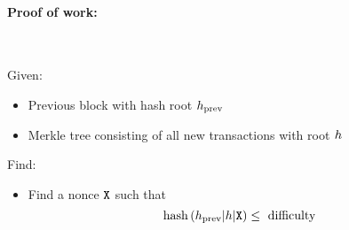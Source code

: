 \paragraph{Proof of work:\newline}
\begin{minipage}{0.75\linewidth}
    \def\svgwidth{\columnwidth}
        
\end{minipage}\\
\begin{description}
    \item Given:
        \begin{itemize}
        \item Previous block with hash root $\color{green}h_{\text {prev}}$
        \item Merkle tree consisting of all new transactions with root $\textcolor{blue}h$
        \end{itemize}{}
    \item Find:
        \begin{itemize}
        \item Find a nonce $\texttt{\textcolor{red}{X}}$ such that
        $$
        \operatorname{hash}\left(\textcolor{green}{h_{\text {prev}}}|\textcolor{blue}h|\texttt{\textcolor{red}{X}}\right) \leq \text { difficulty }
        $$
        \end{itemize}{}
\end{description}{}
